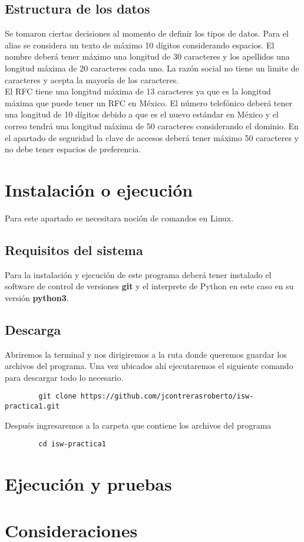 \documentclass[12pt]{article}
\begin{document}
		\subsection{Estructura de los datos}
			Se tomaron ciertas decisiones al momento de definir los tipos de datos. Para el alias se considera un texto de máximo 10 dígitos considerando espacios. El nombre deberá tener máximo una longitud de 30 caracteres y los apellidos una longitud máxima de 20 caracteres cada uno. La razón social no tiene un limite de caracteres y acepta la mayoría de los caracteres.
			\\
			El RFC tiene una longitud máxima de 13 caracteres ya que es la longitud máxima que puede tener un RFC en México. El número telefónico deberá tener una longitud de 10 dígitos debido a que es el nuevo estándar en México y el correo tendrá una longitud máxima de 50 caracteres considerando el dominio.
			En el apartado de seguridad la clave de accesos deberá tener máximo 50 caracteres y no debe tener espacios de preferencia.
					
			
	\newpage	
	\section{Instalación o ejecución}
		Para este apartado se necesitara noción de comandos en Linux.
		\subsection{Requisitos del sistema}		
		Para la instalación y ejecución de este programa deberá tener instalado el software de control de versiones \textbf{git} y el interprete de Python en este caso en su versión \textbf{python3}. 
		
		\subsection{Descarga}		
		Abriremos la terminal y nos dirigiremos a la ruta donde queremos guardar los archivos del programa. Una vez ubicados ahí ejecutaremos el siguiente comando para descargar todo lo necesario.
		
		\begin{lstlisting}
		git clone https://github.com/jcontrerasroberto/isw-practica1.git
		\end{lstlisting}
		Después ingresaremos a la carpeta que contiene los archivos del programa
		
		\begin{lstlisting}
		cd isw-practica1 
		\end{lstlisting}
		
	\section{Ejecución y pruebas}
	
	\section{Consideraciones}
\end{document}
